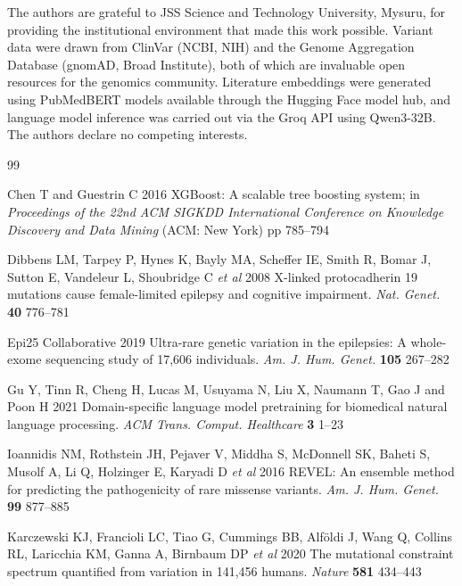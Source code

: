 \documentclass[12pt,a4paper]{article}
\begin{document}
The authors are grateful to JSS Science and Technology University,
Mysuru, for providing the institutional environment that made this
work possible. Variant data were drawn from ClinVar (NCBI, NIH)
and the Genome Aggregation Database (gnomAD, Broad Institute),
both of which are invaluable open resources for the genomics
community. Literature embeddings were generated using PubMedBERT
models available through the Hugging Face model hub, and language
model inference was carried out via the Groq API using Qwen3-32B.
The authors declare no competing interests.
\begin{thebibliography}{99}

Chen T and Guestrin C 2016 XGBoost: A scalable tree boosting
system; in \textit{Proceedings of the 22nd ACM SIGKDD International
Conference on Knowledge Discovery and Data Mining} (ACM: New York)
pp 785--794

Dibbens LM, Tarpey P, Hynes K, Bayly MA, Scheffer IE, Smith R,
Bomar J, Sutton E, Vandeleur L, Shoubridge C \textit{et al} 2008
X-linked protocadherin 19 mutations cause female-limited epilepsy
and cognitive impairment. \textit{Nat. Genet.} \textbf{40} 776--781

Epi25 Collaborative 2019 Ultra-rare genetic variation in the
epilepsies: A whole-exome sequencing study of 17,606 individuals.
\textit{Am. J. Hum. Genet.} \textbf{105} 267--282

Gu Y, Tinn R, Cheng H, Lucas M, Usuyama N, Liu X, Naumann T,
Gao J and Poon H 2021 Domain-specific language model pretraining
for biomedical natural language processing.
\textit{ACM Trans. Comput. Healthcare} \textbf{3} 1--23

Ioannidis NM, Rothstein JH, Pejaver V, Middha S, McDonnell SK,
Baheti S, Musolf A, Li Q, Holzinger E, Karyadi D \textit{et al}
2016 REVEL: An ensemble method for predicting the pathogenicity of
rare missense variants. \textit{Am. J. Hum. Genet.} \textbf{99} 877--885

Karczewski KJ, Francioli LC, Tiao G, Cummings BB, Alf\"{o}ldi J,
Wang Q, Collins RL, Laricchia KM, Ganna A, Birnbaum DP
\textit{et al} 2020 The mutational constraint spectrum quantified
from variation in 141,456 humans. \textit{Nature} \textbf{581}
434--443


\end{thebibliography}
\end{document}
